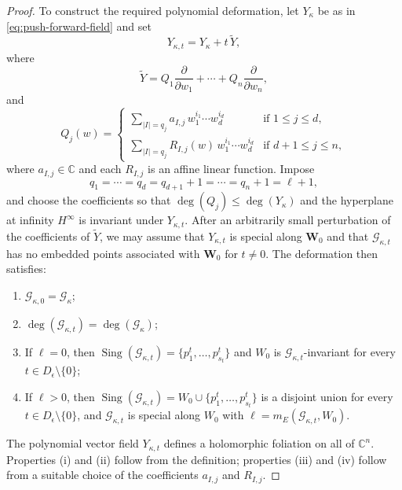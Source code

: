 \documentclass[10pt,a4paper]{amsart}
\DeclareMathOperator{\sing}{Sing}
\newcommand{\C}{\mathbb{C}}
\newcommand{\W}{\mathbf{W}}
\begin{document}
\begin{proof}
To construct the required polynomial deformation, let $Y_\kappa$ be as in \eqref{eq:push-forward-field} and set
\begin{equation}
Y_{\kappa,t}=Y_\kappa+t\,\widetilde{Y},
\end{equation}
where
\[
\widetilde{Y}=Q_1\frac{\partial}{\partial w_1}+\cdots+Q_n\frac{\partial}{\partial w_n},
\]
and
\[
Q_j(w)=
\begin{cases}
\displaystyle\sum_{|I|=q_j} a_{I,j}\, w_1^{i_1}\cdots w_d^{i_d} & \text{if } 1\leq j\leq d,\\[6pt]
\displaystyle\sum_{|I|=q_j} R_{I,j}(w)\, w_1^{i_1}\cdots w_d^{i_d} & \text{if } d+1\leq j\leq n,
\end{cases}
\]
where $a_{I,j}\in\C$ and each $R_{I,j}$ is an affine linear function.
Impose
\[
q_1=\cdots=q_d=q_{d+1}+1=\cdots=q_n+1=\ell+1,
\]
and choose the coefficients so that $\deg(Q_j)\leq \deg(Y_\kappa)$ and the hyperplane at infinity $H^\infty$ is invariant under $Y_{\kappa,t}$.
After an arbitrarily small perturbation of the coefficients of $\widetilde Y$, we may assume that $Y_{\kappa,t}$ is special along $\W_0$ and that $\mathcal G_{\kappa,t}$ has no embedded points associated with $\W_0$ for $t\neq0$. The deformation then satisfies:
\begin{enumerate}
\item[(i)] $\mathcal{G}_{\kappa,0}=\mathcal{G}_\kappa$;
\item[(ii)] $\deg(\mathcal{G}_{\kappa,t})=\deg(\mathcal{G}_\kappa)$;
\item[(iii)] If $\ell=0$, then $\sing(\mathcal{G}_{\kappa,t})=\{p_1^t,\ldots,p_{s_t}^t\}$ and $W_0$ is $\mathcal{G}_{\kappa,t}$-invariant for every $t\in D_\epsilon\setminus\{0\}$;
\item[(iv)] If $\ell>0$, then $\sing(\mathcal{G}_{\kappa,t})=W_0\cup\{p_1^t,\ldots,p_{s_t}^t\}$ is a disjoint union for every $t\in D_\epsilon\setminus\{0\}$, and $\mathcal{G}_{\kappa,t}$ is special along $W_0$ with $\ell=m_E(\mathcal{G}_{\kappa,t},W_0)$.
\end{enumerate}

The polynomial vector field $Y_{\kappa,t}$ defines a holomorphic foliation on all of $\C^n$. Properties (i) and (ii) follow from the definition; properties (iii) and (iv) follow from a suitable choice of the coefficients $a_{I,j}$ and $R_{I,j}$.


\end{proof}
\end{document}
